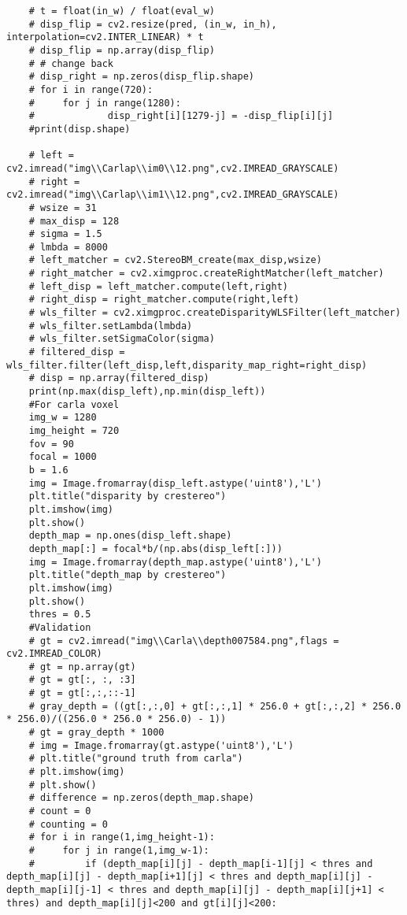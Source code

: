 \begin{verbatim}
    # t = float(in_w) / float(eval_w)
    # disp_flip = cv2.resize(pred, (in_w, in_h), interpolation=cv2.INTER_LINEAR) * t
    # disp_flip = np.array(disp_flip)
    # # change back
    # disp_right = np.zeros(disp_flip.shape)
    # for i in range(720):
    #     for j in range(1280):
    #             disp_right[i][1279-j] = -disp_flip[i][j]
    #print(disp.shape)

    # left = cv2.imread("img\\Carlap\\im0\\12.png",cv2.IMREAD_GRAYSCALE)
    # right = cv2.imread("img\\Carlap\\im1\\12.png",cv2.IMREAD_GRAYSCALE)
    # wsize = 31
    # max_disp = 128
    # sigma = 1.5
    # lmbda = 8000
    # left_matcher = cv2.StereoBM_create(max_disp,wsize)
    # right_matcher = cv2.ximgproc.createRightMatcher(left_matcher)
    # left_disp = left_matcher.compute(left,right)
    # right_disp = right_matcher.compute(right,left)
    # wls_filter = cv2.ximgproc.createDisparityWLSFilter(left_matcher)
    # wls_filter.setLambda(lmbda)
    # wls_filter.setSigmaColor(sigma)
    # filtered_disp = wls_filter.filter(left_disp,left,disparity_map_right=right_disp)
    # disp = np.array(filtered_disp)
    print(np.max(disp_left),np.min(disp_left))
    #For carla voxel
    img_w = 1280
    img_height = 720
    fov = 90
    focal = 1000
    b = 1.6
    img = Image.fromarray(disp_left.astype('uint8'),'L')
    plt.title("disparity by crestereo")
    plt.imshow(img)
    plt.show()
    depth_map = np.ones(disp_left.shape)
    depth_map[:] = focal*b/(np.abs(disp_left[:]))
    img = Image.fromarray(depth_map.astype('uint8'),'L')
    plt.title("depth_map by crestereo")
    plt.imshow(img)
    plt.show()
    thres = 0.5
    #Validation
    # gt = cv2.imread("img\\Carla\\depth007584.png",flags = cv2.IMREAD_COLOR)
    # gt = np.array(gt)
    # gt = gt[:, :, :3]
    # gt = gt[:,:,::-1]
    # gray_depth = ((gt[:,:,0] + gt[:,:,1] * 256.0 + gt[:,:,2] * 256.0 * 256.0)/((256.0 * 256.0 * 256.0) - 1))
    # gt = gray_depth * 1000
    # img = Image.fromarray(gt.astype('uint8'),'L')
    # plt.title("ground truth from carla")
    # plt.imshow(img)
    # plt.show()
    # difference = np.zeros(depth_map.shape)
    # count = 0
    # counting = 0
    # for i in range(1,img_height-1):
    #     for j in range(1,img_w-1):
    #         if (depth_map[i][j] - depth_map[i-1][j] < thres and depth_map[i][j] - depth_map[i+1][j] < thres and depth_map[i][j] - depth_map[i][j-1] < thres and depth_map[i][j] - depth_map[i][j+1] < thres) and depth_map[i][j]<200 and gt[i][j]<200:

\end{verbatim}
